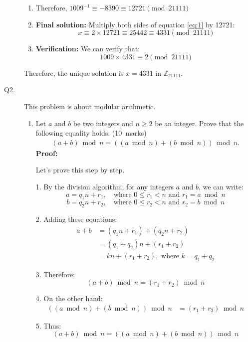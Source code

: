 \documentclass[11pt,epsfig]{article}
\begin{document}
\begin{description}
\begin{enumerate}
    \item Therefore, $1009^{-1} \equiv -8390 \equiv 12721 \pmod{21111}$

    \item \textbf{Final solution:} Multiply both sides of equation \ref{eq:1} by 12721:
    \[
    x \equiv 2 \times 12721 \equiv 25442 \equiv 4331 \pmod{21111}
    \]

    \item \textbf{Verification:} We can verify that:
    \[
    1009 \times 4331 \equiv 2 \pmod{21111}
    \]
\end{enumerate}

Therefore, the unique solution is $x = 4331$ in $\mathbb{Z}_{21111}$.



\item[Q2.] 
This problem is about modular arithmetic.   
\begin{enumerate} 
\item Let $a$ and $b$ be two integers and $n \geq 2$ be an integer.  Prove that the following equality holds: \hfill (10~marks)  
\begin{eqnarray*}
( a + b) \bmod{n}= ((a \bmod{n}) + (b \bmod{n})) \bmod{n}.   
\end{eqnarray*}
\textbf{Proof:}

Let's prove this step by step.

1. By the division algorithm, for any integers \(a\) and \(b\), we can write:
    \[
    a = q_1n + r_1, \quad \text{where } 0 \leq r_1 < n \text{ and } r_1 = a \bmod{n}
    \]
    \[
    b = q_2n + r_2, \quad \text{where } 0 \leq r_2 < n \text{ and } r_2 = b \bmod{n}
    \]

2. Adding these equations:
    \begin{align*}
    a + b &= (q_1n + r_1) + (q_2n + r_2) \\
          &= (q_1 + q_2)n + (r_1 + r_2) \\
          &= kn + (r_1 + r_2), \text{ where } k = q_1 + q_2
    \end{align*}

3. Therefore:
    \[
    (a + b) \bmod{n} = (r_1 + r_2) \bmod{n}
    \]

4. On the other hand:
    \begin{align*}
    ((a \bmod{n}) + (b \bmod{n})) \bmod{n} &= (r_1 + r_2) \bmod{n}
    \end{align*}

5. Thus:
    \[
    (a + b) \bmod{n} = ((a \bmod{n}) + (b \bmod{n})) \bmod{n}
    \]


\end{enumerate}
\end{description}
\end{document}
